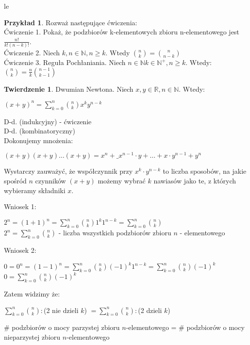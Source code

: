 le\documentclass{article}
\theoremstyle{definition}
\theoremstyle{definition}
\newtheorem{tw}{Twierdzenie}[subsection]
\theoremstyle{definition}
\newtheorem{pk}{Przykład}[subsection]
\theoremstyle{definition}
\begin{document}
\begin{pk}
  Rozważ następujące ćwiczenia: \\
  Ćwiczenie 1. Pokaż, że podzbiorów k-elementowych zbioru n-elementowego jest $\frac{n!}{k!(n-k)!}$.\\
  Ćwiczenie 2. Niech $k,n \in \mathbb{N}, n\geq k$. Wtedy $\binom{n}{k}=\binom{n}{n-k}$\\
  Ćwiczenie 3. Reguła Pochłaniania. Niech $n\in\mathbb{N} k\in\mathbb{N}^{+}, n\geq k$. Wtedy: $\binom{n}{k} = \frac{n}{k} \binom{n-1}{k-1}$
\end{pk}

\begin{tw}
  Dwumian Newtona. Niech $x,y\in \mathbb{R}, n \in \mathbb{N}$. Wtedy:
  \begin{center}
    $(x+y)^n = \sum_{k=0}^{n} \binom{n}{k} x^k y^{n-k}$
  \end{center}
  D-d. (indukcyjny) - ćwiczenie\\
  D-d. (kombinatoryczny)\\
  Dokonujemy mnożenia:
  \begin{center}
    $(x+y)(x+y)\dots(x+y)=x^n + \_ x^{n-1}\cdot y + \dots + x\cdot y^{n-1} + y^n$
  \end{center}
  Wystarczy zauważyć, że współczynnik przy $x^k\cdot y^{n-k}$ to liczba sposobów, na jakie spośród 
  $n$ czynników $(x+y)$ możemy wybrać $k$ nawiasów jako te, z których wybieramy składniki $x$.
\end{tw}

Wniosek 1:\\
\begin{center}
  $2^n = (1+1)^n = \sum_{k=0}^{n} \binom{n}{k} 1^k 1^{n-k} = \sum_{k=0}^{n} \binom{n}{k}$\\
  $2^n = \sum_{k=0}^{n} \binom{n}{k}$ - liczba wszystkich podzbiorów zbioru $n$ - elementowego
\end{center}

Wniosek 2:\\
\begin{center}
  $0=0^n=(1-1)^n=\sum_{k=0}^{n} \binom{n}{k} (-1)^{k} 1^{n-k} = \sum_{k=0}^{n} \binom{n}{k} (-1)^{k}$\\
  $0=\sum_{k=0}^{n} \binom{n}{k} (-1)^k$
\end{center}

Zatem widzimy że:
\begin{center}
  $\sum_{k=0}^{n} \binom{n}{k} :$(2 nie dzieli $k$) $ = \sum_{k=0}^{n} \binom{n}{k} :$(2 dzieli $k$)
\end{center}
\# podzbiorów o mocy parzystej zbioru $n$-elementowego = \# podzbiorów o mocy nieparzystej zbioru $n$-elementowego
\end{document}
